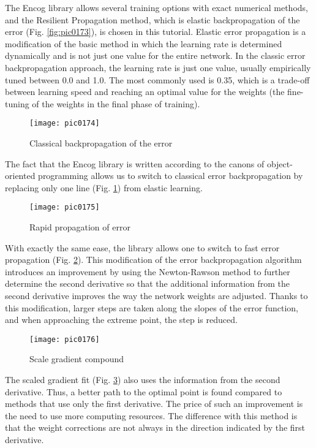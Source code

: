 The Encog library allows several training options with exact numerical methods, and the Resilient Propagation method, which is elastic backpropagation of the error (Fig. \ref{fig:pic0173}), is chosen in this tutorial. Elastic error propagation is a modification of the basic method in which the learning rate is determined dynamically and is not just one value for the entire network. In the classic error backpropagation approach, the learning rate is just one value, usually empirically tuned between 0.0 and 1.0. The most commonly used is 0.35, which is a trade-off between learning speed and reaching an optimal value for the weights (the fine-tuning of the weights in the final phase of training).

\begin{figure}[h]
\centering
\texttt{[image: pic0174]}
\caption{Classical backpropagation of the error}
\label{fig:pic0174}
\end{figure}
\FloatBarrier

The fact that the Encog library is written according to the canons of object-oriented programming allows us to switch to classical error backpropagation by replacing only one line (Fig. \ref{fig:pic0174}) from elastic learning.

\begin{figure}[h]
\centering
\texttt{[image: pic0175]}
\caption{Rapid propagation of error}
\label{fig:pic0175}
\end{figure}
\FloatBarrier

With exactly the same ease, the library allows one to switch to fast error propagation (Fig. \ref{fig:pic0175}). This modification of the error backpropagation algorithm introduces an improvement by using the Newton-Rawson method to further determine the second derivative so that the additional information from the second derivative improves the way the network weights are adjusted. Thanks to this modification, larger steps are taken along the slopes of the error function, and when approaching the extreme point, the step is reduced.

\begin{figure}[h]
\centering
\texttt{[image: pic0176]}
\caption{Scale gradient compound}
\label{fig:pic0176}
\end{figure}
\FloatBarrier

The scaled gradient fit (Fig. \ref{fig:pic0176}) also uses the information from the second derivative. Thus, a better path to the optimal point is found compared to methods that use only the first derivative. The price of such an improvement is the need to use more computing resources. The difference with this method is that the weight corrections are not always in the direction indicated by the first derivative.


